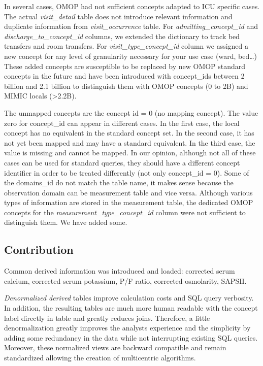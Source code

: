 In several cases, OMOP had not sufficient concepts adapted to ICU specific
cases. The actual \textit{visit\_detail} table does not introduce relevant
information and duplicate information from \textit{visit\_occurrence} table.
For \textit{admitting\_concept\_id} and \textit{discharge\_to\_concept\_id}
columns, we extended the dictionary to track bed transfers and room transfers.
For \textit{visit\_type\_concept\_id} column we assigned a new concept for any
level of granularity necessary for your use case (ward, bed\ldots) These added
concepts are susceptible to be replaced by new OMOP standard concepts in the
future and have been introduced with concept\_ids between 2 billion and 2.1
billion to distinguish them with OMOP concepts (0 to 2B) and MIMIC locals
(>2.2B).

The unmapped concepts are the concept id = 0 (no mapping concept).  The value
zero for concept\_id can appear in different cases. In the first case, the
local concept has no equivalent in the standard concept set. In the second
case, it has not yet been mapped and may have a standard equivalent. In the
third case, the value is missing and cannot be mapped. In our opinion, although
not all of these cases can be used for standard queries, they should have a
different concept identifier in order to be treated differently (not only
concept\_id = 0). Some of the domains\_id do not match the table name, it makes
sense because the observation domain can be measurement table and vice versa.
Although various types of information are stored in the measurement table, the
dedicated OMOP concepts for the \textit{measurement\_type\_concept\_id} column
were not sufficient to distinguish them. We have added some. 

%
%
\subsection{Contribution}
Common derived information was introduced and loaded: corrected serum calcium,
corrected serum potassium, P/F ratio, corrected osmolarity, SAPSII.

\emph{Denormalized derived} tables improve calculation costs and SQL query verbosity. 
In addition, the resulting tables are much more human readable with the concept 
label directly in table and greatly reduces joins. Therefore, a little 
denormalization greatly improves the analysts experience and the simplicity
 by adding some redundancy in the data while not interrupting existing SQL queries. 
Moreover, these normalized views are backward compatible and remain 
standardized allowing the creation of multicentric algorithms.

